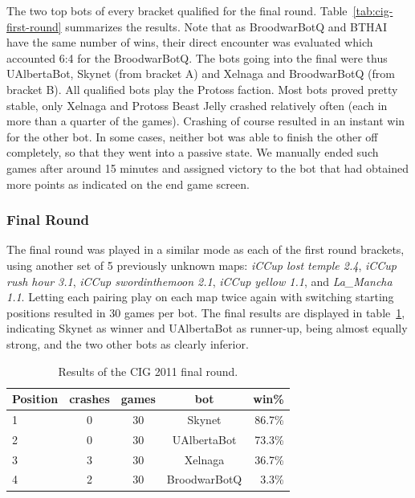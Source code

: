 \documentclass[journal]{IEEEtran}
\begin{document}
The two top bots of every bracket qualified
for the final round. Table~\ref{tab:cig-first-round} summarizes
the results.
Note that as BroodwarBotQ and BTHAI have the same number of wins,
their direct encounter was evaluated which accounted 6:4 for the BroodwarBotQ.
The bots going into the final were thus UAlbertaBot, Skynet (from bracket A)
and Xelnaga and BroodwarBotQ (from bracket B). All qualified bots play the
Protoss faction. Most bots proved pretty stable, only Xelnaga and Protoss 
Beast Jelly crashed relatively often (each in more than a quarter of the games). 
Crashing of course resulted in an instant win for the other bot.
In some cases, neither bot was able to finish the other off completely,
so that they went into a passive state. We manually ended such games after
around 15 minutes and assigned victory to the bot that had obtained more
points as indicated on the end game screen.


\subsubsection{Final Round}
\label{sec:cig-final-round}

The final round was played in a similar mode as each of the
first round brackets,
using another set of 5 previously unknown maps:
\emph{iCCup lost temple 2.4}, \emph{iCCup rush hour 3.1},
\emph{iCCup swordinthemoon 2.1}, \emph{iCCup yellow 1.1},
and \emph{La\_Mancha 1.1}. 
Letting each pairing play on each map twice again with
switching starting positions resulted in 30 games per bot.
The final results are displayed in table~\ref{tab:cig-final-round},
indicating Skynet as winner and UAlbertaBot as runner-up, being
almost equally strong, and the two other bots as clearly inferior.


\begin{table}[t!]
\caption{Results of the CIG 2011 final round.}
\label{tab:cig-final-round}
\begin{small}
\begin{center}
\begin{tabular}{|l|c|c|c|r|}
\hline
Position & crashes & games & bot	& win\%\\ \hline
1 & 0 &  30 &	 Skynet	  		&  86.7\%\\
2 & 0 &	 30 &	 UAlbertaBot 	&  73.3\%\\
3 & 3 &	 30 &	 Xelnaga  		&  36.7\%\\
4 & 2 &	 30 &	 BroodwarBotQ  	&  3.3\%\\
\hline
\end{tabular}
\end{center}
\end{small}
\end{table}
\end{document}
